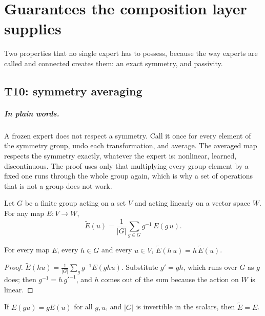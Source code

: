 \chapter{Guarantees the composition layer supplies}

Two properties that no single expert has to possess, because the way experts
are called and connected creates them: an exact symmetry, and passivity.

\section{T10: symmetry averaging}

\paragraph{In plain words.}
A frozen expert does not respect a symmetry.  Call it once for every element of
the symmetry group, undo each transformation, and average.  The averaged map
respects the symmetry exactly, whatever the expert is: nonlinear, learned,
discontinuous.  The proof uses only that multiplying every group element by a
fixed one runs through the whole group again, which is why a set of operations
that is not a group does not work.

\begin{definition}\label{def:average}
  \leanok
  Let $G$ be a finite group acting on a set $V$ and acting linearly on a vector
  space $W$.  For any map $E:V\to W$,
  \[
    \tilde E(u)=\frac1{|G|}\sum_{g\in G}g^{-1}\,E(g\,u).
  \]
\end{definition}

\begin{theorem}\label{thm:T10}
  \leanok
  For every map $E$, every $h\in G$ and every $u\in V$,
  $\tilde E(h\,u)=h\,\tilde E(u)$.
\end{theorem}

\begin{proof}
  \leanok
  $\tilde E(hu)=\frac1{|G|}\sum_gg^{-1}E(ghu)$.  Substitute $g'=gh$, which runs
  over $G$ as $g$ does; then $g^{-1}=h\,g'^{-1}$, and $h$ comes out of the sum
  because the action on $W$ is linear.
\end{proof}

\begin{proposition}\label{prop:T10-idem}
  \leanok
  If $E(gu)=gE(u)$ for all $g,u$, and $|G|$ is invertible in the scalars, then
  $\tilde E=E$.
\end{proposition}

